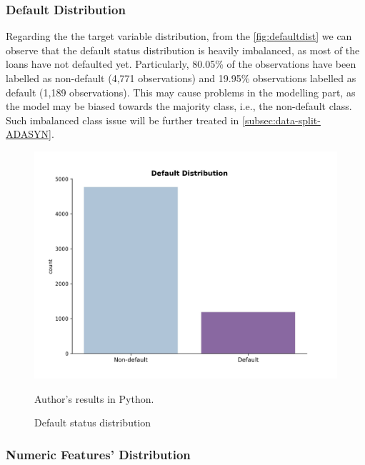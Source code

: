 \subsubsection{Default Distribution}

Regarding the the target variable distribution, from the \autoref{fig:defaultdist} we can observe that the default status distribution is heavily imbalanced, as most of the loans have not defaulted yet.
Particularly, 80.05\% of the observations have been labelled as non-default (4,771 observations) and 19.95\% observations labelled as default (1,189 observations).
This may cause problems in the modelling part, as the model may be biased towards the majority class, i.e., the non-default class. Such imbalanced class issue will be further treated in \autoref{subsec:data-split-ADASYN}.

\begin{figure}[H]
    \begin{center}
    \caption{Default status distribution}
    \label{fig:defaultdist}
    \includegraphics[width=150mm]{Figures/Default_Distribution.jpg}
\end{center}
\begin{center}
    \begin{source}Author's results in Python.\end{source}
    \end{center}
\end{figure}

\subsubsection{Numeric Features' Distribution}
\label{subsubsec:numdist}

